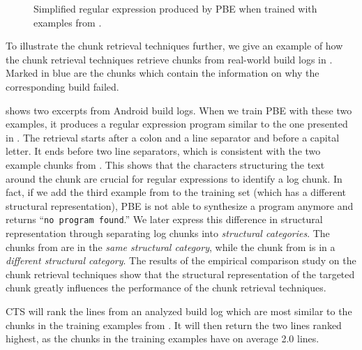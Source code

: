 \begin{figure}[tbp]
  \centering
  
  \caption{Simplified regular expression produced by PBE when trained
  with examples from .}
  \label{lst:prose-program-simplified}
\end{figure}


To illustrate the chunk retrieval techniques further, we give
an example of how the chunk retrieval techniques retrieve chunks from
real-world build logs in .
Marked in blue are the chunks
which contain the information on why the
corresponding build failed.

 shows two excerpts
from Android build logs.
When we train PBE with these two examples, it produces
a regular expression program similar to the one presented in
.
The retrieval
starts after a colon and a line separator and before a capital
letter.
It ends before two line separators,
which is consistent with the two example
chunks from .
This shows that the characters structuring the text around the chunk are
crucial for regular expressions to identify a log chunk.
In fact, if we add the third example from 
to the training set (which has a
different structural representation),
PBE is not able to synthesize a program anymore and returns
``\texttt{no program found}.''
We later express this difference in structural representation through
separating log chunks into \emph{structural categories}.
The chunks from 
are in the \emph{same structural category}, while the chunk from
 is in a
\emph{different structural category}.
The results of the empirical comparison study on the chunk retrieval
techniques
show that the structural representation of the targeted chunk greatly
influences
the performance of the chunk retrieval techniques.

CTS will rank the lines from an analyzed build log which are most
similar to the chunks in the training examples
from .
It will then return the two lines ranked highest, as the chunks in
the training examples have on average 2.0 lines.

